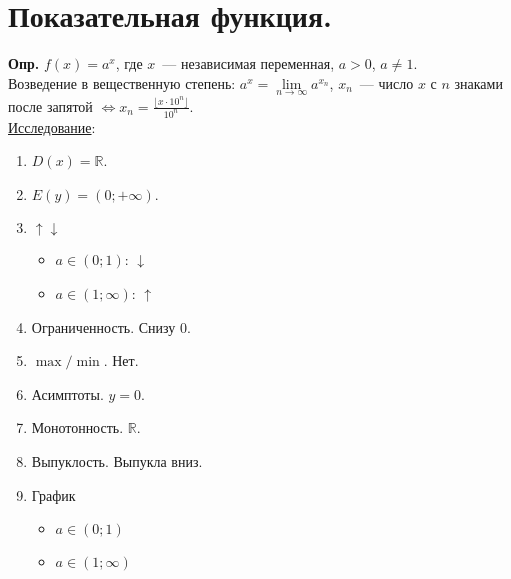 \documentclass{article}
\begin{document}
	\section{Показательная функция.}
	\textbf{Опр.} $f(x) = a^x$, где $x$~--- независимая переменная, $a > 0$, $a \not= 1$. \\
	Возведение в вещественную степень: $a^x = \lim\limits_{n \rightarrow \infty} a^{x_n}$, $x_n$~--- число $x$ с $n$ знаками после запятой $\Leftrightarrow x_n = \frac{\lfloor x \cdot 10^n \rfloor}{10^n}$. \\
	\underline{Исследование}:
	\begin{enumerate}
		\item $D(x) = \mathbb{R}$.
		\item $E(y) = (0; +\infty)$.
		\item $\uparrow \downarrow$
		\begin{itemize}
			\item $a \in (0; 1)$: $\downarrow$
			\item $a \in (1; \infty)$: $\uparrow$
		\end{itemize}
		\item Ограниченность. Снизу $0$.
		\item $\max/\min$. Нет.
		\item Асимптоты. $y = 0$.
		\item Монотонность. $\mathbb{R}$.
		\item Выпуклость. Выпукла вниз.
		\item График
		\begin{itemize}
			\item $a \in (0; 1)$
			\begin{figure}[H]
			\end{figure}
			\item $a \in (1; \infty)$
			\begin{figure}[H]
				\begin{tikzpicture}

\end{tikzpicture}
\end{figure}
\end{itemize}
\end{enumerate}
\end{document}
